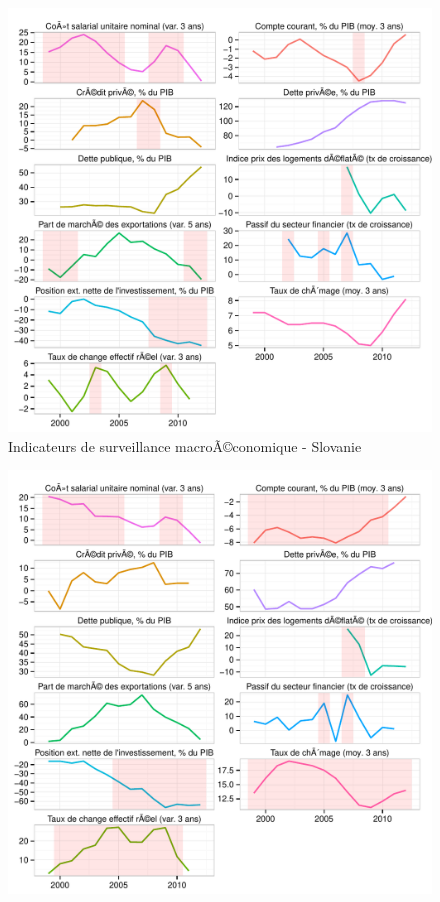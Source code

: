 \documentclass{article}\usepackage[]{graphicx}\usepackage[]{color}
\makeatletter
\def\maxwidth{ %
  \ifdim\Gin@nat@width>\linewidth
    \linewidth
  \else
    \Gin@nat@width
  \fi
}
\newenvironment{knitrout}{}{} %
\makeatother
\begin{document}
\begin{knitrout}
\begin{figure}[p]
{\centering \includegraphics[width=\maxwidth]{figure_graph/byco26} 

}

\caption[Indicateurs de surveillance macroÃ©conomique - Slovanie]{Indicateurs de surveillance macroÃ©conomique - Slovanie\label{fig:byco26}}
\end{figure}

\begin{figure}[p]


{\centering \includegraphics[width=\maxwidth]{figure_graph/byco27} 

}
\end{figure}
\end{knitrout}
\end{document}
